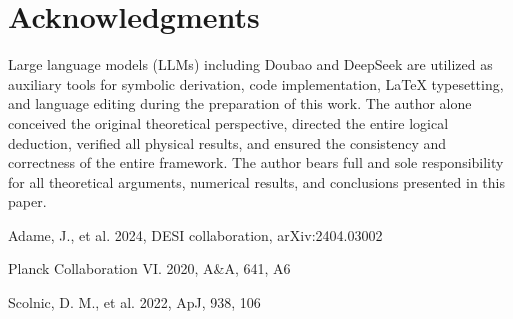 \documentclass[10pt,twocolumn]{article}
\begin{document}
\section*{Acknowledgments}
Large language models (LLMs) including Doubao and DeepSeek are utilized as auxiliary tools for symbolic derivation, code implementation, LaTeX typesetting, and language editing during the preparation of this work. The author alone conceived the original theoretical perspective, directed the entire logical deduction, verified all physical results, and ensured the consistency and correctness of the entire framework. The author bears full and sole responsibility for all theoretical arguments, numerical results, and conclusions presented in this paper.

\begin{thebibliography}{}
Adame, J., et al. 2024, DESI collaboration, arXiv:2404.03002

Planck Collaboration VI. 2020, A\&A, 641, A6

Scolnic, D. M., et al. 2022, ApJ, 938, 106
\end{thebibliography}
\end{document}
